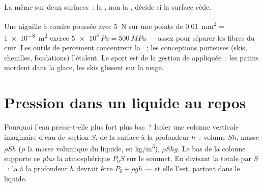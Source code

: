 \begin{omfigure}
\qquad
{}

{\small La même  sur deux surfaces~: la
, non la , décide si la
surface cède.}
\end{omfigure}

\begin{remark}\label{rem:g10:pressure:tools}
Une aiguille à coudre poussée avec \qty{5}{N} sur une pointe de
\qty{0.01}{mm^2} = \qty{1e-8}{m^2} exerce
$\qty{5e8}{Pa} = \qty{500}{MPa}$ --- assez pour séparer les fibres du
cuir. Les outils de percement concentrent la ~; les
conceptions porteuses (skis, chenilles, fondations) l'étalent. Le sport
est de la gestion de  appliquée~: les patins mordent
dans la glace, les skis glissent sur la neige.
\end{remark}

\section{Pression dans un liquide au repos}

Pourquoi l'eau presse-t-elle plus fort plus bas~? Isoler une colonne
verticale imaginaire d'eau de section $S$, de la surface à la profondeur
$h$~: volume $Sh$, masse $\rho S h$ ($\rho$ la masse volumique du
liquide, en \unit{kg/m^3}),  $\rho S h g$. Le bas de la
colonne supporte ce  \emph{plus} la 
atmosphérique $P_0 S$ sur le sommet. En divisant la
 totale par $S$~: la  à la
profondeur $h$ devrait être $P_0 + \rho g h$ --- et elle l'est, partout
dans le liquide.

